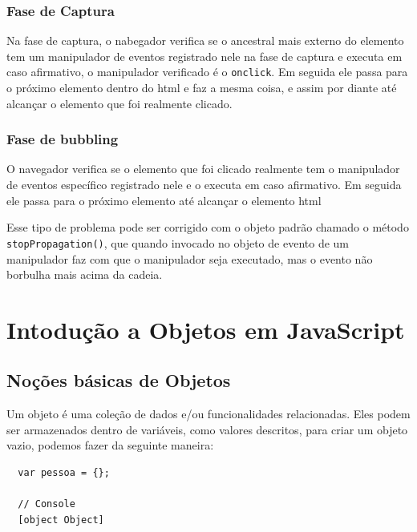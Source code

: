 \documentclass[12pt, a4paper]{paper}
\begin{document}
\subsubsection{Fase de Captura} %
\label{sec:Fase de Captura}
Na fase de captura, o nabegador verifica se o ancestral mais externo do elemento tem 
um manipulador de eventos registrado nele na fase de captura e executa em caso 
afirmativo, o manipulador verificado é o \texttt{onclick}. Em seguida ele passa para 
o próximo elemento dentro do html e faz a mesma coisa, e assim por diante até alcançar o elemento que foi realmente clicado.

\subsubsection{Fase de bubbling} %
\label{sec:Fase de bubbling}
O navegador verifica se o elemento que foi clicado realmente tem o manipulador de 
eventos específico registrado nele e o executa em caso afirmativo. Em seguida ele passa 
para o próximo elemento até alcançar o elemento html

Esse tipo de problema pode ser corrigido com o objeto padrão chamado o método 
\texttt{stopPropagation()}, que quando invocado no objeto de evento de um manipulador 
faz com que o manipulador seja executado, mas o evento não borbulha mais acima da 
cadeia.

\section{Intodução a Objetos em JavaScript} %
\label{sec:Intodução a Objetos em JavaScript}
\subsection{Noções básicas de Objetos} %
\label{sub:Noções básicas de Objetos}
Um objeto é uma coleção de dados e/ou funcionalidades relacionadas. Eles podem ser 
armazenados dentro de variáveis, como valores descritos, para criar um objeto vazio, 
podemos fazer da seguinte maneira: 

\begin{verbatim}
  var pessoa = {};

  // Console
  [object Object]
\end{verbatim}
\end{document}
